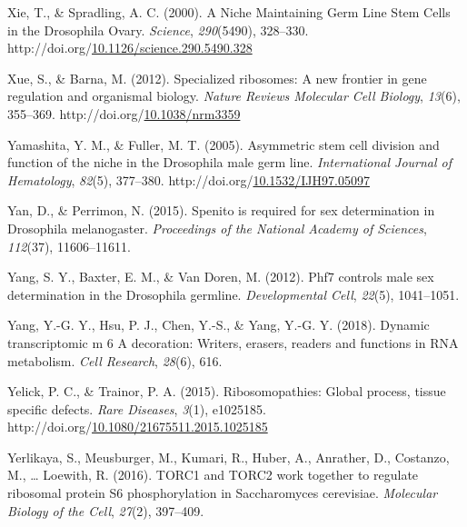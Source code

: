 \documentclass[12pt,oneside]{reedthesis}
\newlength{\cslhangindent}
\newenvironment{CSLReferences}[2] %
 {%
  \setlength{\parindent}{0pt}
  \ifodd #1 \everypar{\setlength{\hangindent}{\cslhangindent}}\ignorespaces\fi
  \ifnum #2 > 0
  \setlength{\parskip}{#2\baselineskip}
  \fi
 }%
 {}
\begin{document}
\begin{CSLReferences}{1}{0}
\leavevmode{}%
Xie, T., \& Spradling, A. C. (2000). A {Niche Maintaining Germ Line Stem Cells} in the {Drosophila Ovary}. \emph{Science}, \emph{290}(5490), 328--330. http://doi.org/\href{https://doi.org/10.1126/science.290.5490.328}{10.1126/science.290.5490.328}

\leavevmode{}%
Xue, S., \& Barna, M. (2012). Specialized ribosomes: A new frontier in gene regulation and organismal biology. \emph{Nature Reviews Molecular Cell Biology}, \emph{13}(6), 355--369. http://doi.org/\href{https://doi.org/10.1038/nrm3359}{10.1038/nrm3359}

\leavevmode{}%
Yamashita, Y. M., \& Fuller, M. T. (2005). Asymmetric stem cell division and function of the niche in the {Drosophila} male germ line. \emph{International Journal of Hematology}, \emph{82}(5), 377--380. http://doi.org/\href{https://doi.org/10.1532/IJH97.05097}{10.1532/IJH97.05097}

\leavevmode{}%
Yan, D., \& Perrimon, N. (2015). Spenito is required for sex determination in {Drosophila} melanogaster. \emph{Proceedings of the National Academy of Sciences}, \emph{112}(37), 11606--11611.

\leavevmode{}%
Yang, S. Y., Baxter, E. M., \& Van Doren, M. (2012). Phf7 controls male sex determination in the {Drosophila} germline. \emph{Developmental Cell}, \emph{22}(5), 1041--1051.

\leavevmode{}%
Yang, Y.-G. Y., Hsu, P. J., Chen, Y.-S., \& Yang, Y.-G. Y. (2018). Dynamic transcriptomic m 6 {A} decoration: Writers, erasers, readers and functions in {RNA} metabolism. \emph{Cell Research}, \emph{28}(6), 616.

\leavevmode{}%
Yelick, P. C., \& Trainor, P. A. (2015). Ribosomopathies: {Global} process, tissue specific defects. \emph{Rare Diseases}, \emph{3}(1), e1025185. http://doi.org/\href{https://doi.org/10.1080/21675511.2015.1025185}{10.1080/21675511.2015.1025185}

\leavevmode{}%
Yerlikaya, S., Meusburger, M., Kumari, R., Huber, A., Anrather, D., Costanzo, M., \ldots{} Loewith, R. (2016). {TORC1} and {TORC2} work together to regulate ribosomal protein {S6} phosphorylation in {Saccharomyces} cerevisiae. \emph{Molecular Biology of the Cell}, \emph{27}(2), 397--409.


\end{CSLReferences}
\end{document}
